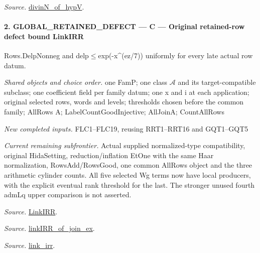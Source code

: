 \emph{Source.} \href{https://github.com/CocoSgt/riemann-hypothesis-lean/blob/7cbf7a0c32fca1badf05931879a37c3f8a2b03b4/src/Development/AutomorphicArithmetic/CharacterBoxes/DivinNOfHypV.lean#L117-L134}{divinN\_\allowbreak of\_\allowbreak hypV}.



\paragraph{2. GLOBAL\_\allowbreak RETAINED\_\allowbreak DEFECT — C — Original retained-row defect bound LinkIRR}

Rows.DelpNonneg and delp$\le$exp(-x\textasciicircum{}(ez/7)) uniformly for every late actual row datum.

\emph{Shared objects and choice order.} one FamP; one class $\mathcal A$ and its target-compatible subclass; one coefficient field per family datum; one x and i at each application; original selected rows, words and levels; thresholds chosen before the common family; AllRows A; LabelCountGoodInjective; AllJoinA; CountAllRows

\emph{New completed inputs.} FLC1–FLC19, reusing RRT1–RRT16 and GQT1–GQT5

\emph{Current remaining subfrontier.} Actual supplied normalized-type compatibility, original HidaSetting, reduction/inflation EtOne with the same Haar normalization, RowsAdd/RowsGood, one common AllRows object and the three arithmetic cylinder counts. All five selected Wg terms now have local producers, with the explicit eventual rank threshold for the last. The stronger unused fourth admLq upper comparison is not asserted.

\emph{Source.} \href{https://github.com/CocoSgt/riemann-hypothesis-lean/blob/7cbf7a0c32fca1badf05931879a37c3f8a2b03b4/src/Formalism/SharpRestriction/GlobalTheoremInputs.lean#L55-L58}{LinkIRR}.

\emph{Source.} \href{https://github.com/CocoSgt/riemann-hypothesis-lean/blob/7cbf7a0c32fca1badf05931879a37c3f8a2b03b4/src/Development/AbelianVarietyTheory/Proofs/GlobalInterpolation/LinkIRROfJoinEx.lean#L17-L38}{linkIRR\_\allowbreak of\_\allowbreak join\_\allowbreak ex}.

\emph{Source.} \href{https://github.com/CocoSgt/riemann-hypothesis-lean/blob/7cbf7a0c32fca1badf05931879a37c3f8a2b03b4/src/Development/AbelianVarietyTheory/Proofs/GlobalInterpolation/LinkIRROfJoinEx.lean#L143-L166}{link\_\allowbreak irr}.



